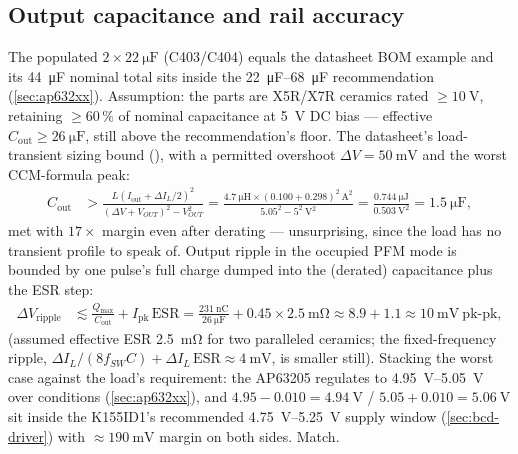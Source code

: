 \subsection{Output capacitance and rail accuracy}\label{sec:5v-cout}

The populated $2\times\SI{22}{\micro\farad}$ (C403/C404) equals the datasheet BOM example
and its \SI{44}{\micro\farad} nominal total sits inside the \SIrange{22}{68}{\micro\farad}
recommendation (\cref{sec:ap632xx}). Assumption: the parts are X5R/X7R ceramics rated
$\geq \SI{10}{\volt}$, retaining $\geq 60\,\%$ of nominal capacitance at 5~V DC bias ---
effective $C_{\mathrm{out}} \geq \SI{26}{\micro\farad}$, still above the recommendation's
floor. The datasheet's load-transient sizing bound (), with a
permitted overshoot $\Delta V = \SI{50}{\milli\volt}$ and the worst CCM-formula peak:
\begin{align*}
  C_{\mathrm{out}} &> \frac{L\left(I_{\mathrm{out}}+\Delta I_L/2\right)^2}
                          {(\Delta V + V_{OUT})^2 - V_{OUT}^2}
    = \frac{\SI{4.7}{\micro\henry} \times (0.100+0.298)^2\,\si{\square\ampere}}{5.05^2 - 5^2\ \si{\square\volt}}
    = \frac{\SI{0.744}{\micro\joule}}{\SI{0.503}{\square\volt}}
    = \SI{1.5}{\micro\farad},
\end{align*}
met with $17\times$ margin even after derating --- unsurprising, since the load has no
transient profile to speak of. Output ripple in the occupied PFM mode is bounded by one
pulse's full charge dumped into the (derated) capacitance plus the ESR step:
\begin{align*}
  \Delta V_{\mathrm{ripple}} &\lesssim \frac{Q_{\max}}{C_{\mathrm{out}}}
      + I_{\mathrm{pk}}\,\mathrm{ESR}
    = \frac{\SI{231}{\nano\coulomb}}{\SI{26}{\micro\farad}}
      + 0.45 \times \SI{2.5}{\milli\ohm}
    \approx 8.9 + 1.1 \approx \SI{10}{\milli\volt}\ \text{pk-pk},
\end{align*}
(assumed effective ESR \SI{2.5}{\milli\ohm} for two paralleled ceramics; the
fixed-frequency ripple, $\Delta I_L/(8 f_{SW} C) + \Delta I_L\,\mathrm{ESR} \approx
\SI{4}{\milli\volt}$, is smaller still). Stacking the worst case against the load's
requirement: the AP63205 regulates to \SIrange{4.95}{5.05}{\volt} over conditions
(\cref{sec:ap632xx}), and $4.95 - 0.010 = \SI{4.94}{\volt}$ /
$5.05 + 0.010 = \SI{5.06}{\volt}$ sit inside the K155ID1's recommended
\SIrange{4.75}{5.25}{\volt} supply window (\cref{sec:bcd-driver}) with
$\approx\SI{190}{\milli\volt}$ margin on both sides. Match.

